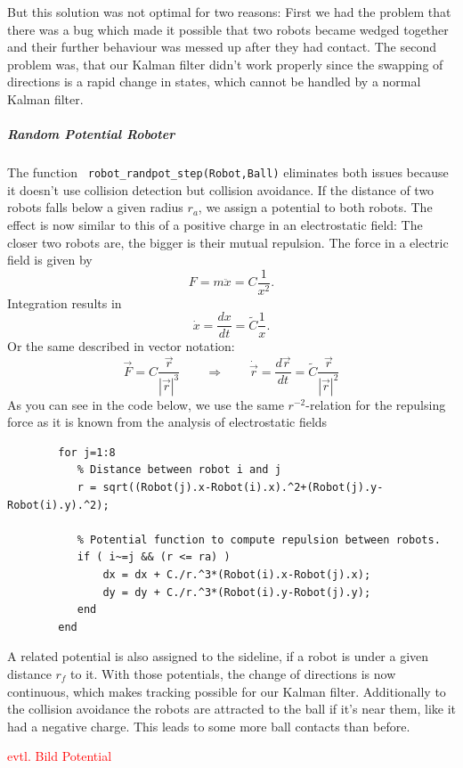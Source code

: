 But this solution was not optimal for two reasons: First we had the problem that there was a bug which made it possible that two robots became wedged together and their further behaviour was messed up after they had contact. The second problem was, that our Kalman filter didn't work properly since the swapping of directions is a rapid change in states, which cannot be handled by a normal Kalman filter. 

\subparagraph{Random Potential Roboter} 
The function \texttt{ robot\_randpot\_step(Robot,Ball)} eliminates both issues because it doesn't use collision detection but collision avoidance. If the distance of two robots falls below a given radius $r_a$, we assign a potential to both robots. The effect is now similar to this of a positive charge in an electrostatic field: The closer two robots are, the bigger is their mutual repulsion. The force in a electric field is given by
	\[ F = m\ddot{x} = C \frac{1}{x^2}.
	\]
Integration results in
	\[ \dot{x} = \frac{dx}{dt} = \tilde{C} \frac{1}{x}.\]
Or the same described in vector notation:
	\[	\vec{F} = C \frac{\vec{r}}{|\vec{r}|^3} \qquad \Rightarrow \qquad \dot{\vec{r}} = \frac{d \vec{r}}{dt} = %
			\tilde{C} \frac{\vec{r}}{|\vec{r}|^2} %
	\]
As you can see in the code below, we use the same \(r^{-2}\)-relation for the repulsing force as it is known from the analysis of electrostatic fields
\begin{lstlisting}
        for j=1:8
           % Distance between robot i and j
           r = sqrt((Robot(j).x-Robot(i).x).^2+(Robot(j).y-Robot(i).y).^2);
            
           % Potential function to compute repulsion between robots.
           if ( i~=j && (r <= ra) )
               dx = dx + C./r.^3*(Robot(i).x-Robot(j).x);
               dy = dy + C./r.^3*(Robot(i).y-Robot(j).y);
           end
        end
\end{lstlisting}

A related potential is also assigned to the sideline, if a robot is under a given distance $r_f$ to it. With those potentials, the change of directions is now continuous, which makes tracking possible for our Kalman filter. Additionally to the collision avoidance the robots are attracted to the ball if it's near them, like it had a negative charge. This leads to some more ball contacts than before.

\textcolor{red}{evtl. Bild Potential}



